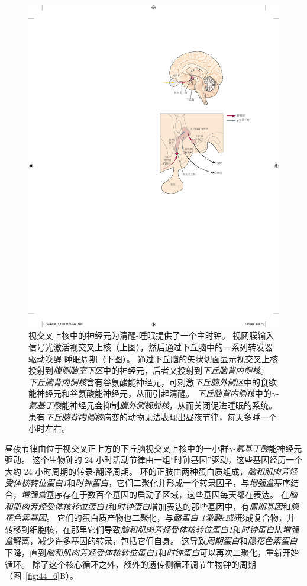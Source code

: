 \begin{figure}[htbp]
	\centering
	\includegraphics[width=0.7\linewidth]{chap44/fig_44_7}
	\caption{视交叉上核中的神经元为清醒-睡眠提供了一个主时钟。
		视网膜输入信号光激活视交叉上核（上图），然后通过下丘脑中的一系列转发器驱动唤醒-睡眠周期（下图）。
		通过下丘脑的矢状切面显示视交叉上核投射到\textit{腹侧脑室下区}中的神经元，后者又投射到\textit{下丘脑背内侧核}。
		\textit{下丘脑背内侧核}含有谷氨酸能神经元，可刺激\textit{下丘脑外侧区}中的食欲能神经元和谷氨酸能神经元，从而引起清醒。
		\textit{下丘脑背内侧核}中的\textit{$\gamma$-氨基丁酸}能神经元会抑制\textit{腹外侧视前核}，从而关闭促进睡眠的系统。
		患有\textit{下丘脑背内侧核}病变的动物无法表现出昼夜节律，每天多睡一个小时左右。}
	\label{fig:44_7}
\end{figure}


昼夜节律由位于视交叉正上方的下丘脑视交叉上核中的一小群\textit{$\gamma$-氨基丁酸}能神经元驱动。
这个生物钟的 24 小时活动节律由一组“时钟基因”驱动，这些基因经历一个大约 24 小时周期的转录-翻译周期。
环的正肢由两种蛋白质组成，\textit{脑和肌肉芳烃受体核转位蛋白1}和\textit{时钟蛋白}，它们二聚化并形成一个转录因子，与\textit{增强盒}基序结合，\textit{增强盒}基序存在于数百个基因的启动子区域，这些基因每天都在表达。
在\textit{脑和肌肉芳烃受体核转位蛋白1}和\textit{时钟蛋白}增加表达的那些基因中，有\textit{周期基因}和\textit{隐花色素基因}。
它们的蛋白质产物也二聚化，与\textit{酪蛋白-1激酶$\epsilon$或$\delta$}形成复合物，并转移到细胞核，在那里它们导致\textit{脑和肌肉芳烃受体核转位蛋白1}和\textit{时钟蛋白}从\textit{增强盒}解离，减少许多基因的转录，包括它们自身。
这导致\textit{周期蛋白}和\textit{隐花色素蛋白}下降，直到\textit{脑和肌肉芳烃受体核转位蛋白1}和\textit{时钟蛋白}可以再次二聚化，重新开始循环。
除了这个核心循环之外，额外的遗传侧循环调节生物钟的周期（图~\ref{fig:44_6}B）。



